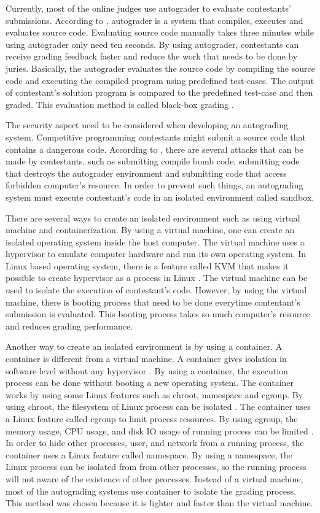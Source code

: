 \documentclass[conference,a4paper]{IEEEtran}
\begin{document}
Currently, most of the online judges use autograder to evaluate contestants' submissions. According to \cite{danutamalms}, autograder is a system that compiles, executes and evaluates source code. Evaluating source code manually takes three minutes while using autograder only need ten seconds. By using autograder, contestants can receive grading feedback faster and reduce the work that needs to be done by juries. Basically, the autograder evaluates the source code by compiling the source code and executing the compiled program using predefined test-cases. The output of contestant's solution program is compared to the predefined test-case and then graded. This evaluation method is called black-box grading \cite{jordanioi}.

The security aspect need to be considered when developing an autograding system. Competitive programming contestants might submit a source code that contains a dangerous code. According to \cite{wasikojsurvey}, there are several attacks that can be made by contestants, such as submitting compile bomb code, submitting code that destroys the autograder environment and submitting code that access forbidden computer's resource. In order to prevent such things, an autograding system must execute contestant's code in an isolated environment called sandbox.

There are several ways to create an isolated environment such as using virtual machine and containerization. By using a virtual machine, one can create an isolated operating system inside the host computer. The virtual machine uses a hypervisor to emulate computer hardware and run its own operating system. In Linux based operating system, there is a feature called KVM that makes it possible to create hypervisor as a process in Linux \cite{wfeltervmcontainer}. The virtual machine can be used to isolate the execution of contestant's code. However, by using the virtual machine, there is booting process that need to be done everytime contentant's submission is evaluated. This booting process takes so much computer's resource and reduces grading performance.

Another way to create an isolated environment is by using a container. A container is different from a virtual machine. A container gives isolation in software level without any hypervisor \cite{merkeldocker}. By using a container, the execution process can be done without booting a new operating system. The container works by using some Linux features such as chroot, namespace and cgroup. By using chroot, the filesystem of Linux process can be isolated \cite{lessardchroot}. The container uses a Linux feature called cgroup to limit process resources. By using cgroup, the memory usage, CPU usage, and disk IO usage of running process can be limited \cite{wfeltervmcontainer}. In order to hide other processes, user, and network from a running process, the container uses a Linux feature called namespace. By using a namespace, the Linux process can be isolated from from other processes, so the running process will not aware of the existence of other processes. Instead of a virtual machine, most of the autograding systems use container to isolate the grading process. This method was chosen because it is lighter and faster than the virtual machine. 
\end{document}
